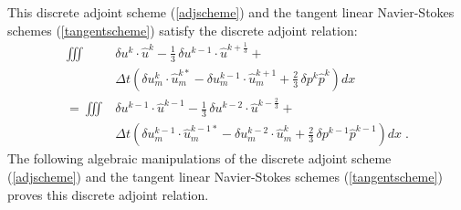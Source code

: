 This discrete adjoint scheme (\ref{adjscheme}) and the tangent linear
Navier-Stokes schemes (\ref{tangentscheme}) satisfy the discrete adjoint
relation:
\begin{equation} \begin{split} \label{adjcondition}
   \iiint & \delta u^k \cdot \hat u^k -
   \frac13\, \delta u^{k-1} \cdot \hat u^{k+\frac13} + \\
 & \Delta t \left( \delta u_m^k \cdot \hat u_m^{k*} -
                   \delta u_m^{k-1} \cdot \hat u_m^{k+1} +
                   \frac23\, \delta p^k \hat p^k \right) dx \\
 = \iiint & \delta u^{k-1} \cdot \hat u^{k-1} -
    \frac13\, \delta u^{k-2} \cdot \hat u^{k-\frac23} + \\
 &  \Delta t \left( \delta u_m^{k-1} \cdot \hat u_m^{k-1*} -
                    \delta u_m^{k-2} \cdot \hat u_m^k
                 + \frac23\, \delta p^{k-1} \hat p^{k-1} \right) dx \;.
\end{split} \end{equation}
The following algebraic manipulations of the 
discrete adjoint scheme (\ref{adjscheme}) and the tangent linear
Navier-Stokes schemes (\ref{tangentscheme}) proves this discrete adjoint
relation.
